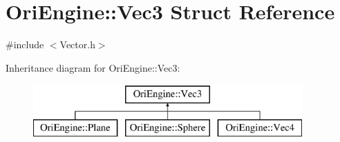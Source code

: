 \hypertarget{struct_ori_engine_1_1_vec3}{}\section{Ori\+Engine\+:\+:Vec3 Struct Reference}
\label{struct_ori_engine_1_1_vec3}


{\ttfamily \#include $<$Vector.\+h$>$}

Inheritance diagram for Ori\+Engine\+:\+:Vec3\+:\begin{figure}[H]
\begin{center}
\leavevmode
\includegraphics[height=2.000000cm]{struct_ori_engine_1_1_vec3}
\end{center}
\end{figure}
